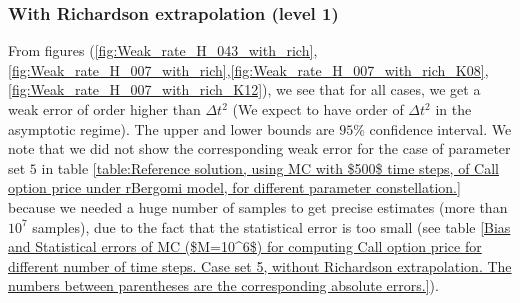 \documentclass[11pt]{article}
\begin{document}
\subsubsection{With Richardson extrapolation (level 1)}
From figures (\ref{fig:Weak_rate_H_043_with_rich}, \ref{fig:Weak_rate_H_007_with_rich},\ref{fig:Weak_rate_H_007_with_rich_K08}, \ref{fig:Weak_rate_H_007_with_rich_K12}), we see that for all cases, we get a weak error of order higher than  $\Delta t^2$ (We expect to have order of $\Delta t^2$ in the asymptotic regime). The upper and lower bounds are $95\%$ confidence interval. We note that we did not show the corresponding weak error for the case of parameter set $5$ in table \ref{table:Reference solution, using MC with $500$ time steps, of Call option price under rBergomi model, for different parameter constellation.} because we needed a huge number of samples to get precise estimates (more than $10^7$ samples), due to the fact that the statistical error is too small (see table \ref{Bias and Statistical errors of MC ($M=10^6$)  for computing Call option price  for different number of time steps. Case set 5, without Richardson extrapolation. The numbers between parentheses are the corresponding absolute errors.}).
\end{document}

